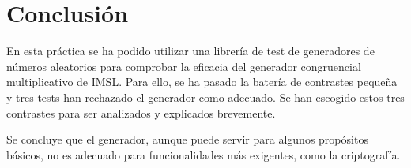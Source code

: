 \documentclass{article}
\begin{document}
\section{Conclusión}
\label{sec:conc}

En esta práctica se ha podido utilizar una librería de test de generadores de números aleatorios para comprobar la eficacia del generador congruencial multiplicativo de IMSL. Para ello, se ha pasado la batería de contrastes pequeña y tres tests han rechazado el generador como adecuado. Se han escogido estos tres contrastes para ser analizados y explicados brevemente.

Se concluye que el generador, aunque puede servir para algunos propósitos básicos, no es adecuado para funcionalidades más exigentes, como la criptografía.

\printbibliography
\end{document}
